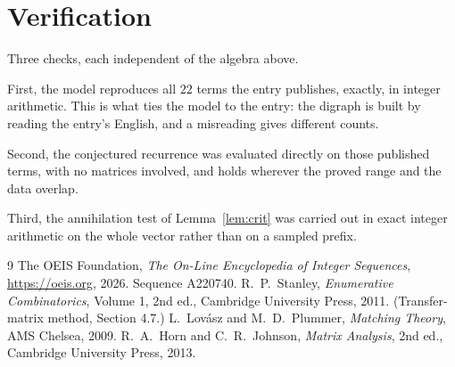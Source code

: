 \documentclass[11pt,a4paper]{article}
\theoremstyle{plain}
\theoremstyle{definition}
\begin{document}
\section{Verification}

Three checks, each independent of the algebra above.

First, the model reproduces all $22$ terms the entry publishes, exactly, in integer
arithmetic. This is what ties the model to the entry: the digraph is built by reading the
entry's English, and a misreading gives different counts.

Second, the conjectured recurrence was evaluated directly on those published terms, with no
matrices involved, and holds wherever the proved range and the data overlap.

Third, the annihilation test of Lemma~\ref{lem:crit} was carried out in exact integer
arithmetic on the whole vector rather than on a sampled prefix.

\begin{thebibliography}{9}
 The OEIS Foundation, \emph{The On-Line Encyclopedia of Integer
Sequences}, \url{https://oeis.org}, 2026. Sequence A220740.
 R.~P.~Stanley, \emph{Enumerative Combinatorics}, Volume 1, 2nd ed.,
Cambridge University Press, 2011. (Transfer-matrix method, Section 4.7.)
 L.~Lov\'asz and M.~D.~Plummer, \emph{Matching Theory}, AMS Chelsea,
2009.
 R.~A.~Horn and C.~R.~Johnson, \emph{Matrix Analysis}, 2nd ed., Cambridge
University Press, 2013.
\end{thebibliography}
\end{document}
